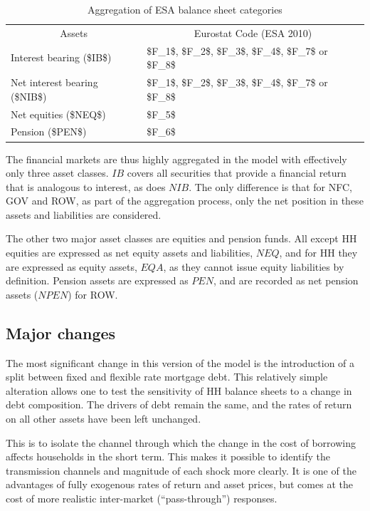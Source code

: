\documentclass[
]{book}
\begin{document}
\begin{table}

\caption{\label{tab:eurostat-aggregation-table}Aggregation of ESA balance sheet categories}
\centering
\fontsize{10}{12}\selectfont
\begin{tabular}[t]{l|l}
\hline
\multicolumn{1}{c|}{Assets} & \multicolumn{1}{c}{Eurostat Code (ESA 2010)} \\
\cline{1-1} \cline{2-2}
Interest bearing (\$IB\$) & \$F\_1\$, \$F\_2\$, \$F\_3\$, \$F\_4\$, \$F\_7\$ or \$F\_8\$\\
\hline
Net interest bearing (\$NIB\$) & \$F\_1\$, \$F\_2\$, \$F\_3\$, \$F\_4\$, \$F\_7\$ or \$F\_8\$\\
\hline
Net equities (\$NEQ\$) & \$F\_5\$\\
\hline
Pension (\$PEN\$) & \$F\_6\$\\
\hline
\end{tabular}
\end{table}

The financial markets are thus highly aggregated in the model with effectively only three asset classes. \(IB\) covers all securities that provide a financial return that is analogous to interest, as does \(NIB\). The only difference is that for NFC, GOV and ROW, as part of the aggregation process, only the net position in these assets and liabilities are considered.

The other two major asset classes are equities and pension funds. All except HH equities are expressed as net equity assets and liabilities, \(NEQ\), and for HH they are expressed as equity assets, \(EQA\), as they cannot issue equity liabilities by definition. Pension assets are expressed as \(PEN\), and are recorded as net pension assets (\(NPEN\)) for ROW.

\hypertarget{major-changes}{%
\subsection{Major changes}\label{major-changes}}

The most significant change in this version of the model is the introduction of a split between fixed and flexible rate mortgage debt. This relatively simple alteration allows one to test the sensitivity of HH balance sheets to a change in debt composition. The drivers of debt remain the same, and the rates of return on all other assets have been left unchanged.

This is to isolate the channel through which the change in the cost of borrowing affects households in the short term. This makes it possible to identify the transmission channels and magnitude of each shock more clearly. It is one of the advantages of fully exogenous rates of return and asset prices, but comes at the cost of more realistic inter-market (``pass-through'') responses.
\end{document}
